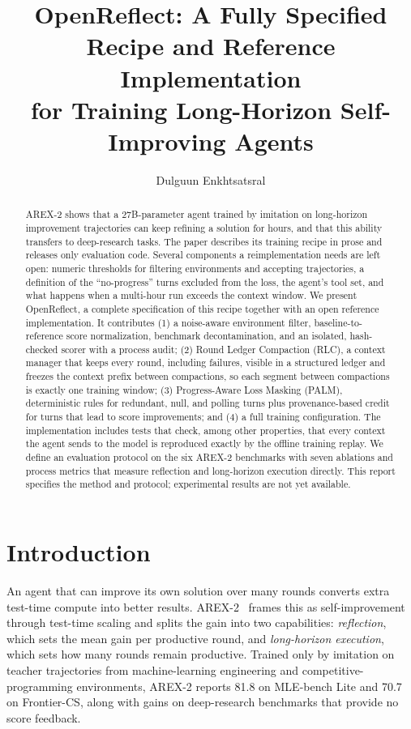 \documentclass[11pt]{article}
\title{\Large\textbf{OpenReflect: A Fully Specified Recipe and Reference Implementation\\for Training Long-Horizon Self-Improving Agents}}
\author{Dulguun Enkhtsatsral}
\date{}
\begin{document}
\maketitle

\begin{abstract}
AREX-2 shows that a 27B-parameter agent trained by imitation on long-horizon improvement trajectories can keep refining a solution for hours, and that this ability transfers to deep-research tasks. The paper describes its training recipe in prose and releases only evaluation code. Several components a reimplementation needs are left open: numeric thresholds for filtering environments and accepting trajectories, a definition of the ``no-progress'' turns excluded from the loss, the agent's tool set, and what happens when a multi-hour run exceeds the context window. We present OpenReflect, a complete specification of this recipe together with an open reference implementation. It contributes (1) a noise-aware environment filter, baseline-to-reference score normalization, benchmark decontamination, and an isolated, hash-checked scorer with a process audit; (2) Round Ledger Compaction (RLC), a context manager that keeps every round, including failures, visible in a structured ledger and freezes the context prefix between compactions, so each segment between compactions is exactly one training window; (3) Progress-Aware Loss Masking (PALM), deterministic rules for redundant, null, and polling turns plus provenance-based credit for turns that lead to score improvements; and (4) a full training configuration. The implementation includes tests that check, among other properties, that every context the agent sends to the model is reproduced exactly by the offline training replay. We define an evaluation protocol on the six AREX-2 benchmarks with seven ablations and process metrics that measure reflection and long-horizon execution directly. This report specifies the method and protocol; experimental results are not yet available.
\end{abstract}

\section{Introduction}

An agent that can improve its own solution over many rounds converts extra test-time compute into better results. AREX-2~\citep{qian2026arex2} frames this as self-improvement through test-time scaling and splits the gain into two capabilities: \emph{reflection}, which sets the mean gain per productive round, and \emph{long-horizon execution}, which sets how many rounds remain productive. Trained only by imitation on teacher trajectories from machine-learning engineering and competitive-programming environments, AREX-2 reports 81.8 on MLE-bench Lite and 70.7 on Frontier-CS, along with gains on deep-research benchmarks that provide no score feedback.
\end{document}
